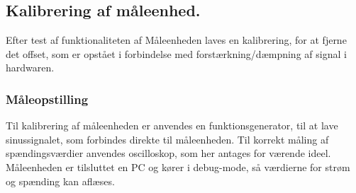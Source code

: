 
\subsection{Kalibrering af måleenhed.}

Efter test af funktionaliteten af Måleenheden laves en kalibrering, for at fjerne det offset, som er opstået i forbindelse med forstærkning/dæmpning af signal i hardwaren. 

\subsubsection{Måleopstilling}

Til kalibrering af måleenheden er anvendes en funktionsgenerator, til at lave sinussignalet, som forbindes direkte til måleenheden. Til korrekt måling af spændingsværdier anvendes oscilloskop, som her antages for værende ideel. Måleenheden er tilsluttet en PC og kører i debug-mode, så værdierne for strøm og spænding kan aflæses. 

